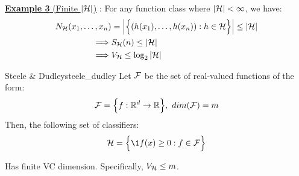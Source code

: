 \noindent\newline\underline{\textbf{Example 3 } (Finite $|\mathcal{H}|$)} : For any function class where $|\mathcal{H}|<\infty$, we have:
\begin{align*}
    N_{\mathcal{H}}(x_1, \dots, x_n) &= \Big| \Big\{ 
        (h(x_1), \dots, h(x_n)) : h \in \mathcal{H}
     \Big\} \Big| \le |\mathcal{H}| \\
    \implies& S_{\mathcal{H}}(n) \le |\mathcal{H}| \\
    \implies& V_{\mathcal{H}} \le \log_2|\mathcal{H}|
\end{align*}

\begin{proposition}{Steele \& Dudley}{steele_dudley}
    Let $\mathcal{F}$ be the set of real-valued functions of the form:
    \begin{align*}
        \mathcal{F} = \Big\{ 
            f: \mathbb{R}^d \to \mathbb{R}
         \Big\}, \ dim(\mathcal{F}) = m
    \end{align*}
    \noindent Then, the following set of classifiers:
    \begin{align*}
        \Hf = \bigCurl{
            \1{f(x) \ge 0} : f \in \F
        }
    \end{align*}

    \noindent Has finite VC dimension. Specifically, $V_{\mathcal{H}} \le m$.
\end{proposition}

